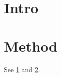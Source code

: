 \documentclass{article}
\begin{document}
\section{Intro}\label{sec:intro}
\section{Method}\label{sec:method}
See \ref{sec:intro} and \ref{sec:method}.

\end{document}
